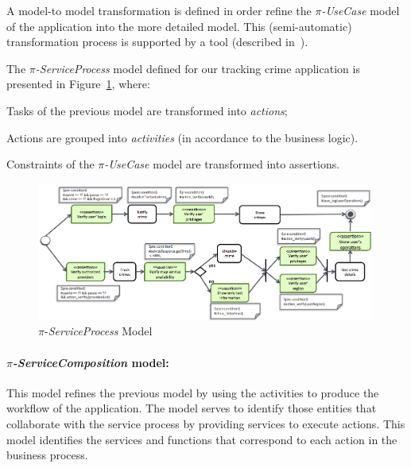 A model-to model transformation is defined in order refine the \textit{$\pi$-UseCase} model of the application into the more detailed model. 
This (semi-automatic) transformation process is supported by a tool (described in~\cite{PlacidoThesis2012}).

The \textit{$\pi$-ServiceProcess} model defined for our tracking crime application is presented in Figure~\ref{fig:piSP}, where: 
\begin{numtrivlist}
\item Tasks of the previous model are transformed into \textit{actions};
\item Actions are grouped into \textit{activities} (in accordance to the business logic).
\item Constraints of the \textit{$\pi$-UseCase} model are transformed into assertions.
\end{numtrivlist}

\begin{figure}[ht!]
\centering
\includegraphics[width=0.99\textwidth]{figs/piServiceProcess}
\caption{$\pi$-\textit{ServiceProcess} Model}
\label{fig:piSP}
\end{figure}

\paragraph*{\textit{$\pi$-ServiceComposition} model:} 
This model refines the previous model by using the activities to produce the workflow of the application.
The model serves to identify those entities that collaborate with the service process by providing services to execute actions. 
This model identifies the services and functions that correspond to each action in the business process.

